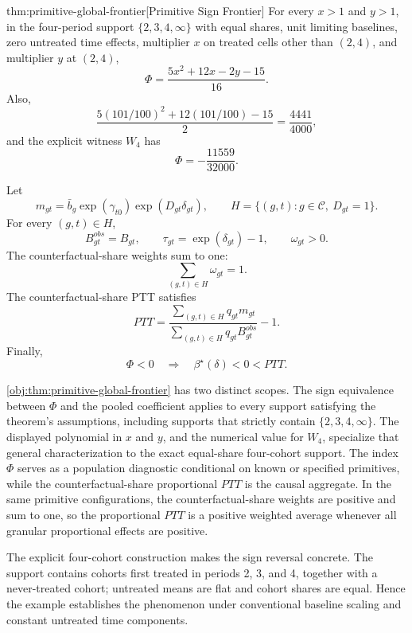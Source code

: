 \begin{theoremv}{thm:primitive-global-frontier}[Primitive Sign Frontier]
For every \(x>1\) and \(y>1\), in the four-period support \(\{2,3,4,\infty\}\) with equal shares, unit limiting baselines, zero untreated time effects, multiplier \(x\) on treated cells other than \((2,4)\), and multiplier \(y\) at \((2,4)\),
\[
\Phi=\frac{5x^2+12x-2y-15}{16}.
\]
Also,
\[
\frac{5(101/100)^2+12(101/100)-15}{2}=\frac{4441}{4000},
\]
and the explicit witness \(W_4\) has
\[
\Phi=-\frac{11559}{32000}.
\]

Let
\[
m_{gt}=\bar b_g\exp(\gamma_{t0})\exp(D_{gt}\delta_{gt}),
\qquad
H=\{(g,t):g\in\mathcal C,\ D_{gt}=1\}.
\]
For every \((g,t)\in H\),
\[
B^{obs}_{gt}=B_{gt},\qquad
\tau_{gt}=\exp(\delta_{gt})-1,\qquad
\omega_{gt}>0.
\]
The counterfactual-share weights sum to one:
\[
\sum_{(g,t)\in H}\omega_{gt}=1.
\]
The counterfactual-share PTT satisfies
\[
PTT
=
\frac{\sum_{(g,t)\in H} q_{gt}m_{gt}}
{\sum_{(g,t)\in H} q_{gt}B^{obs}_{gt}}
-1.
\]
Finally,
\[
\Phi<0
\quad\Longrightarrow\quad
\beta^\star(\delta)<0<PTT .
\]
\end{theoremv}

\cref{obj:thm:primitive-global-frontier} has two distinct scopes. The sign equivalence between \(\Phi\) and the pooled coefficient applies to every support satisfying the theorem's assumptions, including supports that strictly contain \(\{2,3,4,\infty\}\). The displayed polynomial in \(x\) and \(y\), and the numerical value for \(W_4\), specialize that general characterization to the exact equal-share four-cohort support. The index \(\Phi\) serves as a population diagnostic conditional on known or specified primitives, while the counterfactual-share proportional \(PTT\) is the causal aggregate. In the same primitive configurations, the counterfactual-share weights are positive and sum to one, so the proportional \(PTT\) is a positive weighted average whenever all granular proportional effects are positive.

The explicit four-cohort construction makes the sign reversal concrete. The support contains cohorts first treated in periods 2, 3, and 4, together with a never-treated cohort; untreated means are flat and cohort shares are equal. Hence the example establishes the phenomenon under conventional baseline scaling and constant untreated time components.

